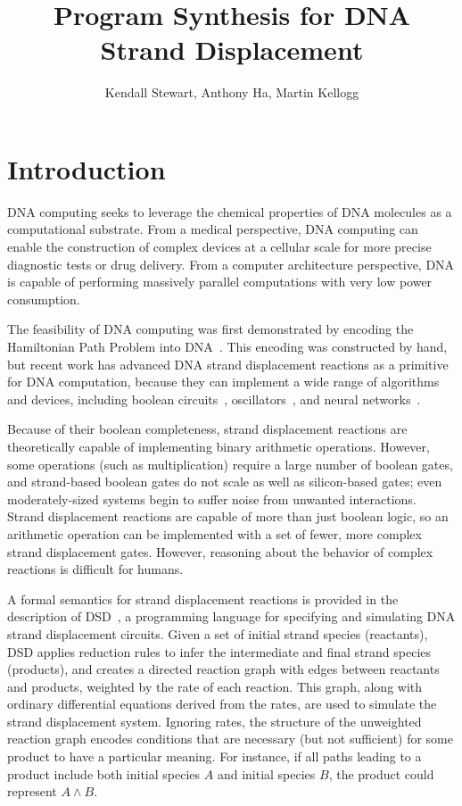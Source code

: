 \documentclass{article}[10pt]
\begin{document}
\title{Program Synthesis for DNA Strand Displacement}
\author{Kendall Stewart, Anthony Ha, Martin Kellogg}
\date{\vspace{-5ex}}

\maketitle

\section{Introduction}

DNA computing seeks to leverage the chemical properties
of DNA molecules as a computational substrate.
From a medical perspective, DNA computing can enable the
construction of complex devices at a cellular scale for more precise
diagnostic tests or drug delivery. From a computer architecture perspective,
DNA is capable of performing massively parallel computations with very low
power consumption.

The feasibility of DNA computing was first demonstrated by encoding the
Hamiltonian Path Problem into DNA~\cite{adelman}. This encoding was constructed
by hand, but recent work has advanced DNA strand displacement reactions as a
primitive for DNA computation, because they can implement a wide
range of algorithms and devices, including boolean circuits~\cite{strands},
oscillators~\cite{dsd}, and neural networks~\cite{strandnn}.

Because of their boolean completeness, strand displacement reactions are
theoretically capable of implementing binary arithmetic operations. However,
some operations (such as multiplication) require a large number of
boolean gates, and strand-based boolean gates do not scale as well as
silicon-based gates; even moderately-sized systems begin to suffer noise
from unwanted interactions. Strand displacement reactions are capable
of more than just boolean
logic, so an arithmetic operation can be implemented with a set of
fewer, more complex strand displacement gates. However, reasoning about the
behavior of complex reactions is difficult for humans.

A formal semantics for strand displacement reactions is provided in the
description of DSD~\cite{dsd}, a programming language for specifying and
simulating DNA strand displacement circuits. Given a set of initial strand
species (reactants), DSD applies reduction rules to infer the intermediate and
final strand species (products), and creates a directed reaction graph with
edges between reactants and products, weighted by the rate of each reaction.
This graph, along with ordinary differential equations derived from the rates,
are used to simulate the strand displacement system.
Ignoring rates, the structure of the unweighted reaction graph encodes
conditions that are necessary (but not sufficient) for some product to have a
particular meaning. For instance, if all paths leading to a product include both
initial species $A$ and initial species $B$, the product could
represent $A \land B$.
\end{document}
